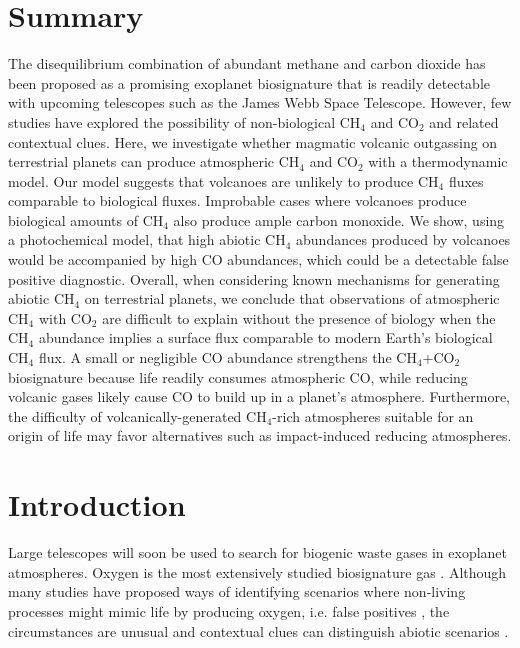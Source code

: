 
\section*{\centering Summary}

The disequilibrium combination of abundant methane and carbon dioxide has been proposed as a promising exoplanet biosignature that is readily detectable with upcoming telescopes such as the James Webb Space Telescope. However, few studies have explored the possibility of non-biological CH$_4$ and CO$_2$ and related contextual clues. Here, we investigate whether magmatic volcanic outgassing on terrestrial planets can produce atmospheric CH$_4$ and CO$_2$ with a thermodynamic model. Our model suggests that volcanoes are unlikely to produce CH$_4$ fluxes comparable to biological fluxes. Improbable cases where volcanoes produce biological amounts of CH$_4$ also produce ample carbon monoxide. We show, using a photochemical model, that high abiotic CH$_4$ abundances produced by volcanoes would be accompanied by high CO abundances, which could be a detectable false positive diagnostic. Overall, when considering known mechanisms for generating abiotic CH$_4$ on terrestrial planets, we conclude that observations of atmospheric CH$_4$ with CO$_2$ are difficult to explain without the presence of biology when the CH$_4$ abundance implies a surface flux comparable to modern Earth's biological CH$_4$ flux. A small or negligible CO abundance strengthens the CH$_4$+CO$_2$ biosignature because life readily consumes atmospheric CO, while reducing volcanic gases likely cause CO to build up in a planet's atmosphere. Furthermore, the difficulty of volcanically-generated CH$_4$-rich atmospheres suitable for an origin of life may favor alternatives such as impact-induced reducing atmospheres.

\section{Introduction} \label{sec:intro}

Large telescopes will soon be used to search for biogenic waste gases in exoplanet atmospheres. Oxygen is the most extensively studied biosignature gas \citep{Meadows_2017,Meadows_2018}. Although many studies have proposed ways of identifying scenarios where non-living processes might mimic life by producing oxygen, i.e. false positives \citep{Domagal-Goldman_2014,Harman_2015,Luger_2015,Schwieterman_2019,Tian_2014,Wordsworth_2014}, the circumstances are unusual and contextual clues can distinguish abiotic scenarios \citep{Meadows_2018}.

